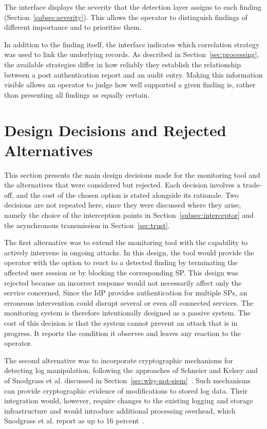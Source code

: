 \documentclass[../main.tex]{subfiles}
\begin{document}
The interface displays the severity that the detection layer assigns to each finding 
(Section~\ref{subsec:severity}). 
This allows the operator to distinguish findings of different importance and to prioritise them. 

In addition to the finding itself, the interface indicates which correlation strategy was used to 
link the underlying records. 
As described in Section~\ref{sec:processing}, the available strategies differ in how reliably they 
establish the relationship between a post authentication report and an audit entry. 
Making this information visible allows an operator to judge how well supported a given finding is, 
rather than presenting all findings as equally certain.

\section{Design Decisions and Rejected Alternatives}\label{sec:design}

This section presents the main design decisions made for the monitoring tool and the alternatives 
that were considered but rejected. 
Each decision involves a trade-off, and the cost of the chosen option is stated alongside its 
rationale. 
Two decisions are not repeated here, since they were discussed where they arise, namely the choice 
of the interception points in Section~\ref{subsec:interceptor} and the asynchronous transmission in 
Section~\ref{sec:trust}.

The first alternative was to extend the monitoring tool with the capability to actively intervene 
in ongoing attacks. 
In this design, the tool would provide the operator with the option to react to a detected finding 
by terminating the affected user session or by blocking the corresponding SP.
This design was rejected because an incorrect response would not necessarily affect only the 
service concerned. 
Since the IdP provides authentication for multiple SPs, an erroneous intervention could disrupt 
several or even all connected services. 
The monitoring system is therefore intentionally designed as a passive system. 
The cost of this decision is that the system cannot prevent an attack that is in progress. 
It reports the condition it observes and leaves any reaction to the operator.

The second alternative was to incorporate cryptographic mechanisms for detecting log manipulation, 
following the approaches of Schneier and Kelsey and of Snodgrass et al. discussed in 
Section~\ref{sec:why-not-siem}~\cite{CryptoSupportSecureLogs, TamperDetection}. 
Such mechanisms can provide cryptographic evidence of modifications to stored log data. 
Their integration would, however, require changes to the existing logging and storage 
infrastructure and would introduce additional processing overhead, which Snodgrass et al. report 
as up to 16 percent~\cite{TamperDetection}.
\end{document}
